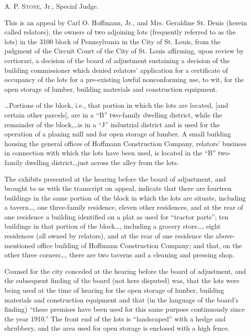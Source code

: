 

\opinion \textsc{A. P. Stone}, Jr., Special Judge.

This is an appeal by Carl O. Hoffmann, Jr., and Mrs. Geraldine St. Denis (herein
called relators), the owners of two adjoining lots (frequently referred to as
the lots) in the 3100 block of Pennsylvania in the City of St. Louis, from the
judgment of the Circuit Court of the City of St. Louis affirming, upon review by
certiorari, a decision of the board of adjustment sustaining a decision of the
building commissioner which denied relators' application for a certificate of
occupancy of the lots for a pre-existing lawful nonconforming use, to wit, for
the open storage of lumber, building materials and construction equipment.

\ldots Portions of the block, i.e., that portion in which the lots are located,
[and certain other parcels], are in a ``B'' two-family dwelling district, while
the remainder of the block,\ldots is in a ``J'' industrial district and is used
for the operation of a planing mill and for open storage of lumber. A small
building housing the general offices of Hoffmann Construction Company, relators'
business in connection with which the lots have been used, is located in the
``B'' two-family dwelling district\ldots just across the alley from the lots.



The exhibits presented at the hearing before the board of adjustment, and
brought to us with the transcript on appeal, indicate that there are fourteen
buildings in the same portion of the block in which the lots are situate,
including a tavern\ldots , one three-family residence, eleven other residences,
and at the rear of one residence a building identified on a plat as used for
``tractor parts''; ten buildings in that portion of the block\ldots , including
a grocery store\ldots , eight residences (all owned by relators), and at the
rear of one residence the above-mentioned office building of Hoffmann
Construction Company; and that, on the other three corners\ldots , there are two
taverns and a cleaning and pressing shop.

Counsel for the city conceded at the hearing before the board of adjustment, and
the subsequent finding of the board (not here disputed) was, that the lots were
being used at the time of hearing for the open storage of lumber, building
materials and construction equipment and that (in the language of the board's
finding) ``these premises have been used for this same purpose continuously
since the year 1910.'' The front end of the lots is ``landscaped'' with a hedge
and shrubbery, and the area used for open storage is enclosed with a high fence.

